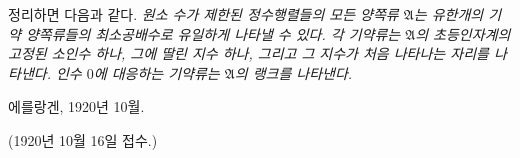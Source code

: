 정리하면 다음과 같다. \emph{원소 수가 제한된 정수행렬들의 모든 양쪽류 $\mathfrak A$는 유한개의 기약 양쪽류들의 최소공배수로 유일하게 나타낼 수 있다. 각 기약류는 $\mathfrak A$의 초등인자계의 고정된 소인수 하나, 그에 딸린 지수 하나, 그리고 그 지수가 처음 나타나는 자리를 나타낸다. 인수 $0$에 대응하는 기약류는 $\mathfrak A$의 랭크를 나타낸다.}

\begin{flushleft}
에를랑겐, 1920년 10월.
\end{flushleft}
\begin{center}
(1920년 10월 16일 접수.)
\end{center}

\clearpage
\setcounter{footnote}{0}
